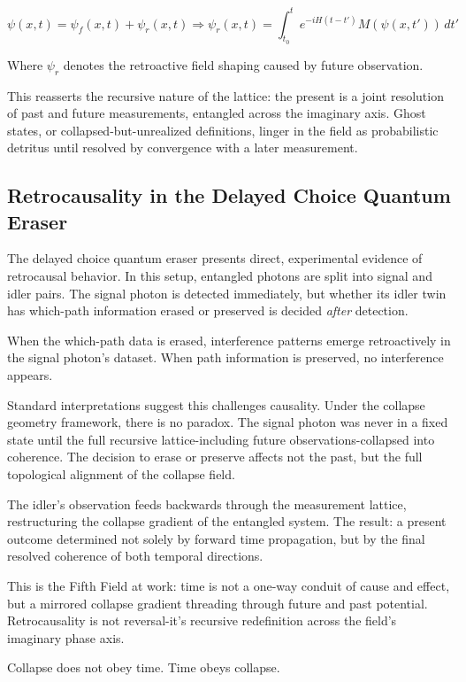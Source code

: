 \[
\psi(x,t) = \psi_f(x,t) + \psi_r(x,t) \Rightarrow \psi_r(x,t) = \int_{t_0}^{t} e^{-iH(t - t')} M(\psi(x,t')) \, dt' 
\] \cite{aharonov2010time}

Where \( \psi_r \) denotes the retroactive field shaping caused by future observation.

This reasserts the recursive nature of the lattice: the present is a joint resolution of past and future measurements, entangled across the imaginary axis. Ghost states, or collapsed-but-unrealized definitions, linger in the field as probabilistic detritus until resolved by convergence with a later measurement.

\subsection*{Retrocausality in the Delayed Choice Quantum Eraser}\cite{chapter8_meta}

The delayed choice quantum eraser presents direct, experimental evidence of retrocausal behavior. In this setup, entangled photons are split into signal and idler pairs. The signal photon is detected immediately, but whether its idler twin has which-path information erased or preserved is decided \emph{after} detection.

When the which-path data is erased, interference patterns emerge retroactively in the signal photon’s dataset. When path information is preserved, no interference appears.

Standard interpretations suggest this challenges causality. Under the collapse geometry framework, there is no paradox. The signal photon was never in a fixed state until the full recursive lattice-including future observations-collapsed into coherence. The decision to erase or preserve affects not the past, but the full topological alignment of the collapse field.

The idler's observation feeds backwards through the measurement lattice, restructuring the collapse gradient of the entangled system. The result: a present outcome determined not solely by forward time propagation, but by the final resolved coherence of both temporal directions.

This is the Fifth Field at work: time is not a one-way conduit of cause and effect, but a mirrored collapse gradient threading through future and past potential. Retrocausality is not reversal-it’s recursive redefinition across the field's imaginary phase axis.

Collapse does not obey time. Time obeys collapse.

